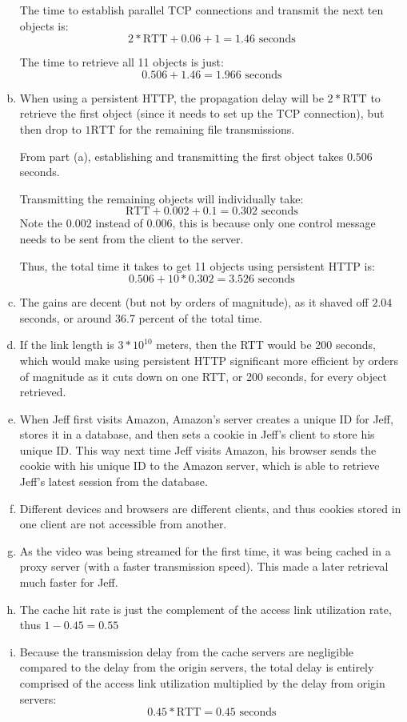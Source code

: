 \documentclass[11pt]{article}
\begin{document}
\begin{enumerate}[(a)]
      The time to establish parallel TCP connections and transmit the next ten objects
      is:
      \[ 2 * \text{RTT} + 0.06 + 1 = 1.46 \text{ seconds} \]

      The time to retrieve all 11 objects is just:
      \[ 0.506 + 1.46 = \boxed{1.966 \text{ seconds}} \]
    \item
      When using a persistent HTTP, the propagation delay will be $2 * \text{RTT}$
      to retrieve the first object (since it needs to set up the TCP connection),
      but then drop to $1 \text{RTT}$ for the remaining file transmissions.

      From part (a), establishing and transmitting the first object takes
      $0.506$ seconds.

      Transmitting the remaining objects will individually take:
      \[ \text{RTT} + 0.002 + 0.1 = 0.302 \text{ seconds} \]
      Note the $0.002$ instead of $0.006$, this is because only one control message
      needs to be sent from the client to the server.

      Thus, the total time it takes to get 11 objects using persistent HTTP is:
      \[ 0.506 + 10 * 0.302 = \boxed{3.526 \text{ seconds}} \]
    \item
      The gains are decent (but not by orders of magnitude), as it shaved off $2.04$
      seconds, or around 36.7 percent of the total time.
    \item
      If the link length is $3 * 10^{10}$ meters, then the RTT would be 200 seconds,
      which would make using persistent HTTP significant more efficient by orders of
      magnitude as it cuts down on one RTT, or 200 seconds, for every object retrieved.
    \item
      When Jeff first visits Amazon, Amazon's server creates a unique ID for Jeff,
      stores it in a database, and then sets a cookie in Jeff's client to store
      his unique ID. This way next time Jeff visits Amazon, his browser sends the
      cookie with his unique ID to the Amazon server, which is able to retrieve
      Jeff's latest session from the database.
    \item
      Different devices and browsers are different clients, and thus cookies stored in one
      client are not accessible from another.
    \item
      As the video was being streamed for the first time, it was being cached in a
      proxy server (with a faster transmission speed). This made a later retrieval
      much faster for Jeff.
    \item
      The cache hit rate is just the complement of the access link utilization
      rate, thus $1 - 0.45 = \boxed{0.55}$
    \item
      Because the transmission delay from the cache servers are negligible compared
      to the delay from the origin servers, the total delay is entirely comprised
      of the access link utilization multiplied by the delay from origin servers:
      \[ 0.45 * \text{RTT} = \boxed{0.45 \text{ seconds}} \]
  \end{enumerate}
\end{document}
